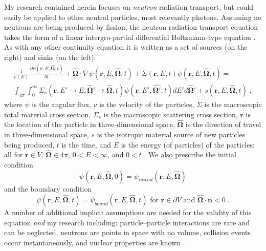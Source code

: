 My research contained herein focuses on \textit{neutron} radiation transport, but could easily be applied to other neutral particles, most relevantly photons.
Assuming no neutrons are being produced by fission, the neutron radiation transport equation takes the form of a linear intergro-partial differential Boltzmann-type equation \cite{duderstadt_hamilton}.
As with any other continuity equation it is written as a set of sources (on the right) and sinks (on the left):
\begin{multline}
    \label{eq:fullNTE}
    \frac{1}{v(E)}\frac{\partial \psi(\boldsymbol{r}, E, \boldsymbol{\hat{\Omega}},t)}{\partial t} + \boldsymbol{\hat{\Omega}} \cdot \nabla \psi(\boldsymbol{r}, E, \boldsymbol{\hat{\Omega}},t) + \Sigma(\bm{r}, E, t) \psi(\boldsymbol{r}, E, \boldsymbol{\hat{\Omega}},t) = \\
    \int_{4\pi}\int_{0}^{\infty}\Sigma_s(\boldsymbol{r}, E'\rightarrow E, \boldsymbol{\hat{\Omega}'} \rightarrow \boldsymbol{\hat{\Omega}}, t)
    \psi(\boldsymbol{r}, E', \boldsymbol{\hat{\Omega'}},t) dE' d\boldsymbol{\hat{\Omega}'} +
    s(\boldsymbol{r}, E, \boldsymbol{\hat{\Omega}},t) \;,
\end{multline}
where $\psi$ is the angular flux, $v$ is the velocity of the particles, $\Sigma$ is the macroscopic total material cross section, $\Sigma_s$ is the macroscopic scattering cross section, $\boldsymbol{r}$ is the location of the particle in three-dimensional space, $\boldsymbol{\hat{\Omega}}$ is the direction of travel in three-dimensional space, $s$ is the isotropic material source of new particles being produced, $t$ is the time, and $E$ is the energy (of particles) of the particles; all for $\boldsymbol{r} \in V$, $\boldsymbol{\hat{\Omega}} \in 4\pi$, $0<E<\infty$, and $0<t$ \cite{duderstadt_hamilton}. We also prescribe the initial condition
\begin{equation}
    \psi(\boldsymbol{r}, E, \boldsymbol{\hat{\Omega}},0) = \psi_{initial}(\boldsymbol{r}, E, \boldsymbol{\hat{\Omega}})
\end{equation}
and the boundary condition
\begin{equation}
    \psi(\boldsymbol{r}, E, \boldsymbol{\hat{\Omega}},t) = \psi_{bound}(\boldsymbol{r}, E, \boldsymbol{\hat{\Omega}},t) \text{ for } \boldsymbol{r} \in \partial V \text{ and } \boldsymbol{\hat{\Omega}} \cdot \boldsymbol{n} < 0 \;.
\end{equation}
A number of additional implicit assumptions are needed for the validity of this equation \textit{and} my research including: particle--particle interactions are rare and can be neglected, neutrons are points in space with no volume, collision events occur instantaneously, and nuclear properties are known \cite{lewis_computational_1984, duderstadt_hamilton}.

